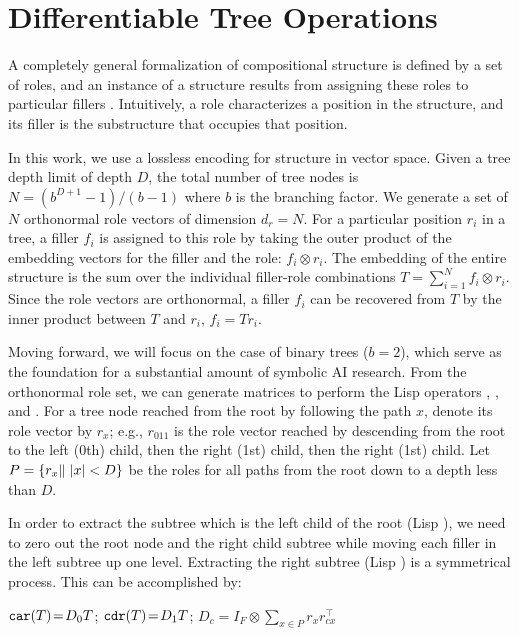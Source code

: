 \section{Differentiable Tree Operations} \label{sec:dtm-tpr}

A completely general formalization of compositional structure is defined by a set of roles, and an instance of a structure results from assigning these roles to particular fillers \cite{Newell1980PhysicalSS}. Intuitively, a role characterizes a position in the structure, and its filler is the substructure that occupies that position. 

In this work, we use a lossless encoding for structure in vector space. Given a tree depth limit of depth $D$, the total number of  tree nodes is $N=(b^{D+1}-1)/(b-1)$ where $b$ is the branching factor. We generate a set of $N$ orthonormal role vectors of dimension $d_r=N$. For a particular position $r_i$ in a tree, a filler $f_i$ is assigned to this role by taking the outer product of the embedding vectors for the filler and the role: $f_i \otimes r_i$. The embedding of the entire structure is the sum over the individual filler-role combinations $T = \sum_{i=1}^N f_i \otimes r_i$. Since the role vectors are orthonormal, a filler $f_i$ can be recovered from $T$ by the inner product between $T$ and $r_i$, $f_i = Tr_i$.

Moving forward, we will focus on the case of binary trees ($b = 2$), which serve as the foundation for a substantial amount of symbolic AI research. From the orthonormal role set, we can generate matrices to perform the Lisp operators \car, \cdr, and \cons. 
For a tree node reached from the root by following the path $x$, denote its role vector by $r_x$; e.g., $r_{011}$ is the role vector reached by descending from the root to the left (0th) child, then the right (1st) child, then the right (1st) child. Let $P = \{r_x \| \hspace{.3em} \lvert x \rvert < D\} $ be the roles for all paths from the root down to a depth less than $D$.

In order to extract the subtree which is the left child of the root (Lisp \car), we need to zero out the root node and the right child subtree while moving each filler in the left subtree up one level. Extracting the right subtree (Lisp \cdr) is a symmetrical process. This can be accomplished by:

$\texttt{car}(T)\!=\!D_0 T$;
$\texttt{cdr}(T)\!=\!D_1 T$;
$D_c \!=\! I_F \! \otimes \! \sum_{x \in P} r_{x}r_{cx}^\top$

